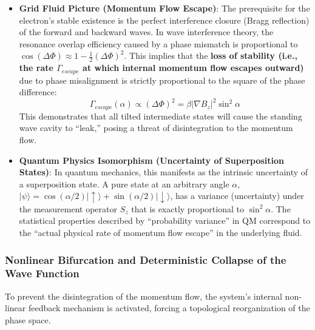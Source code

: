 \documentclass[12pt, a4paper]{article}
\begin{document}
\begin{itemize}
    \item \textbf{Grid Fluid Picture (Momentum Flow Escape)}: The prerequisite for the electron's stable existence is the perfect interference closure (Bragg reflection) of the forward and backward waves. In wave interference theory, the resonance overlap efficiency caused by a phase mismatch is proportional to $\cos(\Delta \Phi) \approx 1 - \frac{1}{2}(\Delta \Phi)^2$. This implies that the \textbf{loss of stability (i.e., the rate $\Gamma_{escape}$ at which internal momentum flow escapes outward)} due to phase misalignment is strictly proportional to the square of the phase difference:
    \begin{equation}
        \Gamma_{escape}(\alpha) \propto (\Delta \Phi)^2 = \beta |\nabla B_z|^2 \sin^2\alpha
    \end{equation}
    This demonstrates that all tilted intermediate states will cause the standing wave cavity to ``leak,'' posing a threat of disintegration to the momentum flow.
    \item \textbf{Quantum Physics Isomorphism (Uncertainty of Superposition States)}: In quantum mechanics, this manifests as the intrinsic uncertainty of a superposition state. A pure state at an arbitrary angle $\alpha$, $|\psi\rangle = \cos(\alpha/2)|\uparrow\rangle + \sin(\alpha/2)|\downarrow\rangle$, has a variance (uncertainty) under the measurement operator $S_z$ that is exactly proportional to $\sin^2\alpha$. The statistical properties described by ``probability variance'' in QM correspond to the ``actual physical rate of momentum flow escape'' in the underlying fluid.
\end{itemize}

\subsubsection{Nonlinear Bifurcation and Deterministic Collapse of the Wave Function}

To prevent the disintegration of the momentum flow, the system's internal non-linear feedback mechanism is activated, forcing a topological reorganization of the phase space.
\end{document}

